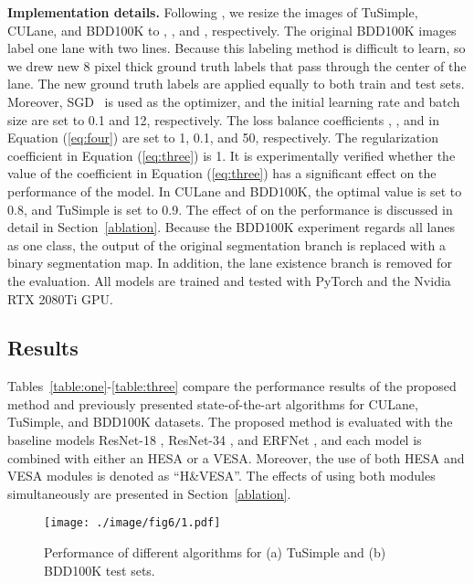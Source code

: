 \documentclass[10pt,twocolumn,letterpaper]{article}
\begin{document}
\noindent
\textbf{Implementation details.} Following \cite{pan2017spatial, hou2019learning}, we resize the images of TuSimple, CULane, and BDD100K to , , and , respectively. The original BDD100K images label one lane with two lines. Because this labeling method is difficult to learn, so we drew new 8 pixel thick ground truth labels that pass through the center of the lane. The new ground truth labels are applied equally to both train and test sets. Moreover, SGD~\cite{bottou2010large} is used as the optimizer, and the initial learning rate and batch size are set to 0.1 and 12, respectively. The loss balance coefficients , , and  in Equation (\ref{eq:four}) are set to 1, 0.1, and 50, respectively. The regularization coefficient  in Equation (\ref{eq:three}) is 1. It is experimentally verified whether the value of the coefficient  in Equation (\ref{eq:three}) has a significant effect on the performance of the model. In CULane and BDD100K, the optimal  value is set to 0.8, and TuSimple is set to 0.9. The effect of  on the performance is discussed in detail in Section~\ref{ablation}. Because the BDD100K experiment regards all lanes as one class, the output of the original segmentation branch is replaced with a binary segmentation map. In addition, the lane existence branch is removed for the evaluation. All models are trained and tested with PyTorch and the Nvidia RTX 2080Ti GPU.

\subsection{Results}
\label{result}
Tables~\ref{table:one}-\ref{table:three} compare the performance results of the proposed method and previously presented state-of-the-art algorithms for CULane, TuSimple, and BDD100K datasets. The proposed method is evaluated with the baseline models ResNet-18 \cite{he2016deep}, ResNet-34 \cite{he2016deep}, and ERFNet \cite{romera2017erfnet}, and each model is combined with either an HESA or a VESA. Moreover, the use of both HESA and VESA modules is denoted as “H\&VESA”. The effects of using both modules simultaneously are presented in Section~\ref{ablation}.

\begin{figure}
	\setlength{\belowcaptionskip}{-24pt}
	\begin{center}
		\texttt{[image: ./image/fig6/1.pdf]}
		\caption{Performance of different algorithms for (a) TuSimple and (b) BDD100K test sets.}
		\label{fig:bdd}
	\end{center}
\end{figure}
\end{document}
